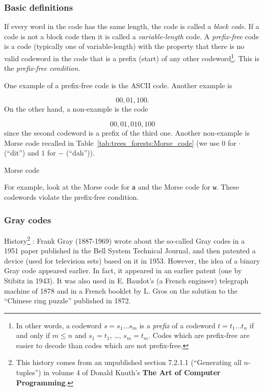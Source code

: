 \subsubsection{Basic definitions}

If every word in the code has the same length, the code is called
a {\it block code}. If a code is not a block code then it is called
a {\it variable-length} code.
A {\it prefix-free} code is a code (typically one of variable-length)
with the property that there is no valid codeword in the code that
is a prefix (start) of any other codeword\footnote{In other words,
a codeword $s=s_1 \dots s_m$ is a {\it prefix} of a codeword
$t=t_1\dots t_n$ if and only if $m\leq n$ and
$s_1=t_1$, \dots, $s_m=t_m$. Codes which are prefix-free are easier
to decode than codes which are not prefix-free.}.
This is the {\it prefix-free condition}.

One example of a prefix-free code is the ASCII code.
Another example is

\[
00, 01, 100.
\]
On the other hand, a non-example is the code

\[
00, 01, 010, 100
\]
since the second codeword is a prefix of the third one.
Another non-example is Morse code recalled in
Table~\ref{tab:trees_forests:Morse_code} (we use $0$ for
$\cdot$ (``dit'') and $1$ for $-$ (``dah'')).

\begin{table}[!htbp]
\centering

\caption{Morse code}
\label{tab:trees_forests:Morse_code}
\end{table}

For example, look at the Morse code for {\tt a} and the Morse code for
{\tt w}. These codewords violate the prefix-free condition.

\subsubsection{Gray codes}

History\footnote{This
history comes from an unpublished section 7.2.1.1
(``Generating all $n$-tuples'')
in volume 4 of Donald Knuth's {\bf The Art of Computer Programming}.
}
: Frank Gray (1887-1969) wrote about the so-called Gray codes in a
1951 paper published in the Bell System Technical Journal,
and then patented a device (used for television sets)
based on it in 1953. However, the idea of a binary Gray code
appeared earlier. In fact, it appeared in an earlier patent
(one by Stibitz in 1943). It was also used in E. Baudot's
(a French engineer) telegraph machine of 1878 and in
a French booklet by L. Gros on the solution to the
``Chinese ring puzzle'' published in 1872.

